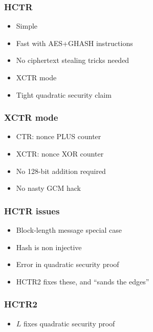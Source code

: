 \documentclass{beamer}
\begin{document}
\begin{frame}

\frametitle{HCTR}

\begin{itemize}
    \item Simple
    \item Fast with AES+GHASH instructions
    \item No ciphertext stealing tricks needed
    \item XCTR mode
    \item Tight quadratic security claim
\end{itemize}
\end{frame}

\begin{frame}

    \frametitle{XCTR mode}
    
    \begin{itemize}
        \item CTR: nonce PLUS counter
        \item XCTR: nonce XOR counter
        \item No 128-bit addition required
        \item No nasty GCM hack
    \end{itemize}
\end{frame}

\begin{frame}

\frametitle{HCTR issues}

\begin{itemize}
    \item Block-length message special case
    \item Hash is non injective
    \item Error in quadratic security proof
    \item HCTR2 fixes these, and ``sands the edges''
\end{itemize}
\end{frame}

\begin{frame}

\frametitle{HCTR2}
\begin{figure}

\end{figure}
\begin{itemize}
    \item $L$ fixes quadratic security proof
\end{itemize}

\end{frame}
\end{document}
